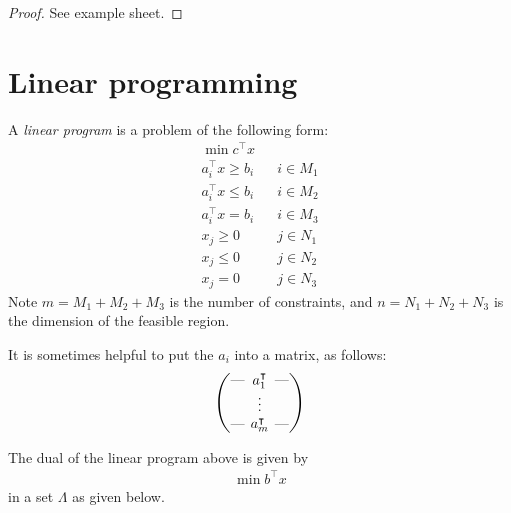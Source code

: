 \documentclass{../template/note}
\begin{document}
    \begin{proof}
        See example sheet.
    \end{proof}    

    \section{Linear programming}

    \begin{definition}
        A \emph{linear program} is a problem of the following form:
        \begin{align*}
            \min c^\intercal x \\
            a_i^\intercal x \geq b_i && i \in M_1 \\
            a_i^\intercal x \leq b_i && i \in M_2 \\
            a_i^\intercal x = b_i && i \in M_3 \\
            x_j \geq 0 && j \in N_1 \\
            x_j \leq 0 && j \in N_2 \\
            x_j = 0 && j \in N_3
        \end{align*}
        Note $m = M_1 + M_2 + M_3$ is the number of constraints, and $n = N_1 + N_2 + N_3$ is the dimension of the feasible region.        

        It is sometimes helpful to put the $a_i$ into a matrix, as follows:
        \begin{align*}
            \begin{pmatrix}
                \lln & a_1^\intercal & \rln \\ 
                 & \vdots & \\ 
                \lln & a_m^\intercal & \rln \\ 
            \end{pmatrix}
        \end{align*}
        
        
    \end{definition}
    
    \begin{theorem}
        The dual of the linear program above is given by
        \begin{align*}
            \min b^\intercal x
        \end{align*}
        in a set $\Lambda$ as given below.
        
    \end{theorem}
    
\end{document}
